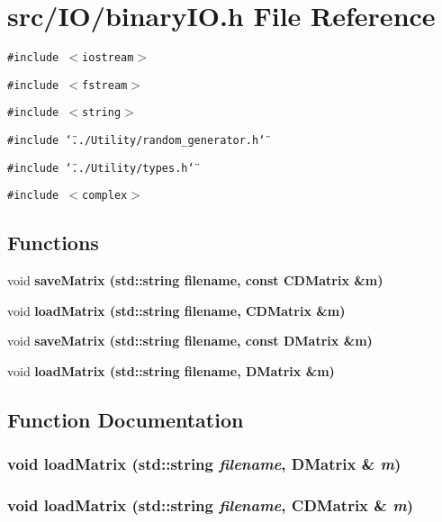 \section{src/IO/binary\-IO.h File Reference}
\label{binaryIO_8h}
{\tt \#include $<$iostream$>$}\par
{\tt \#include $<$fstream$>$}\par
{\tt \#include $<$string$>$}\par
{\tt \#include \char`\"{}../Utility/random\_\-generator.h\char`\"{}}\par
{\tt \#include \char`\"{}../Utility/types.h\char`\"{}}\par
{\tt \#include $<$complex$>$}\par
\subsection*{Functions}
\begin{CompactItemize}
\item 
void \bf{save\-Matrix} (std::string filename, const \bf{CDMatrix} \&m)
\item 
void \bf{load\-Matrix} (std::string filename, \bf{CDMatrix} \&m)
\item 
void \bf{save\-Matrix} (std::string filename, const \bf{DMatrix} \&m)
\item 
void \bf{load\-Matrix} (std::string filename, \bf{DMatrix} \&m)
\end{CompactItemize}


\subsection{Function Documentation}
\subsubsection{\setlength{\rightskip}{0pt plus 5cm}void load\-Matrix (std::string {\em filename}, \bf{DMatrix} \& {\em m})}\label{binaryIO_8h_77a816ac6fd96aa523ae6278bed30e54}


\subsubsection{\setlength{\rightskip}{0pt plus 5cm}void load\-Matrix (std::string {\em filename}, \bf{CDMatrix} \& {\em m})}\label{binaryIO_8h_e981cf29be3572a514c1c2d8b005d46b}


